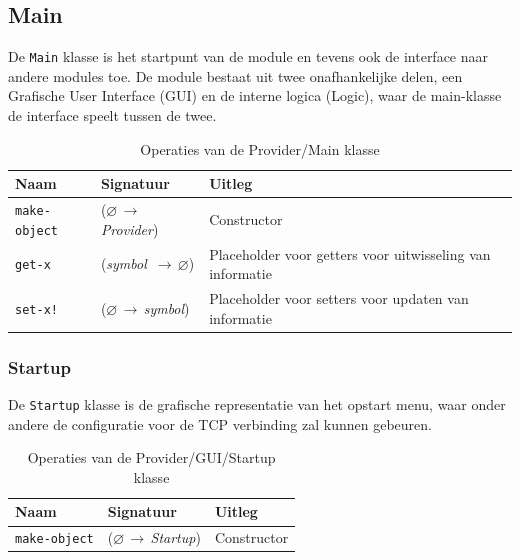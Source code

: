 \documentclass[a4paper, 11pt]{article}
\newcommand{\naar}{\,$\rightarrow$\,}
\renewcommand{\empty}{$\varnothing$}
\newcommand{\<}{\scriptsize\textless\normalsize}
\renewcommand{\>}{\scriptsize\textgreater\normalsize}
\begin{document}
\subsection{Main} %
De \texttt{Main} klasse is het startpunt van de module en tevens ook de interface naar andere modules toe. De module bestaat uit twee onafhankelijke delen, een Grafische User Interface (GUI) en de interne logica (Logic), waar de main-klasse de interface speelt tussen de twee.
\begin{table}[H]
	\begin{center}
		{
			\begin{tabular}{|l l l|}
				\hline
				\textbf{Naam} & \textbf{Signatuur} & \textbf{Uitleg}\\
				\hline
				\texttt{make-object} & (\empty \naar \textit{Provider}) & Constructor\\
				\hline
				\texttt{get-x} & (\textit{symbol} \naar \empty) & Placeholder voor getters voor uitwisseling van informatie\\
				\texttt{set-x!} & (\empty \naar \textit{symbol}) & Placeholder voor setters voor updaten van informatie\\
				\hline
		\end{tabular}}
		\caption{Operaties van de Provider/Main klasse}
	\end{center}
\end{table}

\subsubsection{Startup} %
De \texttt{Startup} klasse is de grafische representatie van het opstart menu, waar onder andere de configuratie voor de TCP verbinding zal kunnen gebeuren.
\begin{table}[H]
	\begin{center}
		{
			\begin{tabular}{|l l l|}
				\hline
				\textbf{Naam} & \textbf{Signatuur} & \textbf{Uitleg}\\
				\hline
				\texttt{make-object} & (\empty \naar \textit{Startup}) & Constructor\\
				\hline
		\end{tabular}}
		\caption{Operaties van de Provider/GUI/Startup klasse}
	\end{center}
\end{table}
\end{document}
